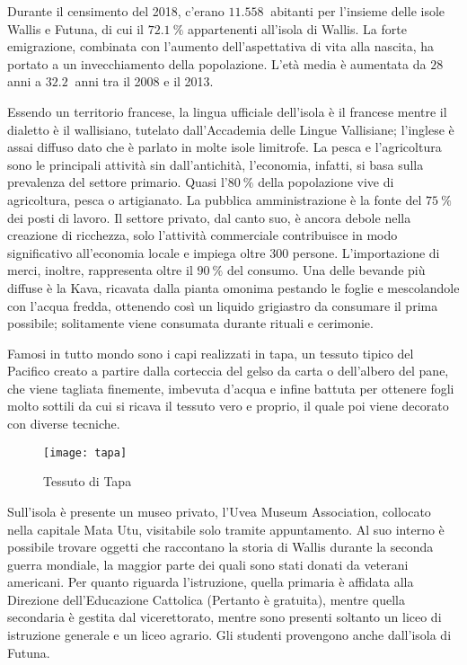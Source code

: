 \documentclass[fleqn,11pt]{SelfArx} %
\begin{document}
Durante il censimento del 2018, c'erano \(\SI{11.558}{}\) abitanti per l'insieme delle isole Wallis e Futuna, di cui il \(\SI{72.1}{\percent}\) appartenenti all'isola di Wallis.
La forte emigrazione, combinata con l'aumento dell'aspettativa di vita alla nascita, ha portato a un invecchiamento della popolazione.
L'età media è aumentata da \(\SI{28}{}\) anni a \(\SI{32.2}{}\) anni tra il 2008 e il 2013. 

Essendo un territorio francese, la lingua ufficiale dell'isola è il francese mentre il dialetto è il wallisiano, tutelato dall'Accademia delle Lingue Vallisiane; l'inglese è assai diffuso dato che è parlato in molte isole limitrofe.
La pesca e l'agricoltura sono le principali attività sin dall'antichità, l'economia, infatti, si basa sulla prevalenza del settore primario.
Quasi l'\(\SI{80}{\percent}\) della popolazione vive di agricoltura, pesca o artigianato.
La pubblica amministrazione è la fonte del \(\SI{75}{\percent}\) dei posti di lavoro.
Il settore privato, dal canto suo, è ancora debole nella creazione di ricchezza, solo l'attività commerciale contribuisce in modo significativo all'economia locale e  impiega oltre 300 persone.
L'importazione di merci, inoltre, rappresenta oltre il \(\SI{90}{\percent}\) del consumo.
Una delle bevande più diffuse è la Kava, ricavata dalla pianta omonima pestando le foglie e mescolandole con l'acqua fredda, ottenendo così un liquido grigiastro da consumare il prima possibile; solitamente viene consumata durante rituali e cerimonie. 

Famosi in tutto mondo sono i capi realizzati in tapa, un tessuto tipico del Pacifico creato a partire dalla corteccia del gelso da carta o dell'albero del pane, che viene tagliata finemente, imbevuta d'acqua e infine battuta per ottenere fogli molto sottili da cui si ricava il tessuto vero e proprio, il quale poi viene decorato con diverse tecniche.

\begin{figure}[ht]\centering
	\texttt{[image: tapa]}
	\caption{Tessuto di Tapa}
	\label{fig:tapa}
\end{figure}

Sull'isola è presente un museo privato, l'Uvea Museum Association, collocato nella capitale Mata Utu, visitabile solo tramite appuntamento.
Al suo interno è possibile trovare oggetti che raccontano la storia di Wallis durante la seconda guerra mondiale, la maggior parte dei quali sono stati donati da veterani americani.
Per quanto riguarda l'istruzione, quella primaria è affidata alla Direzione dell'Educazione Cattolica (Pertanto è gratuita), mentre quella secondaria è gestita dal vicerettorato, mentre sono presenti soltanto un liceo di istruzione generale e un liceo agrario.
Gli studenti provengono anche dall'isola di Futuna.
\end{document}
